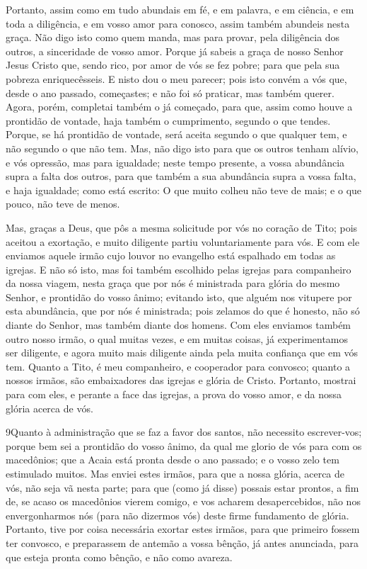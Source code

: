Portanto, assim como em tudo abundais em fé, e em palavra, e em
ciência, e em toda a diligência, e em vosso amor para conosco, assim
também abundeis nesta graça. Não digo isto como quem manda, mas
para provar, pela diligência dos outros, a sinceridade de vosso
amor. Porque já sabeis a graça de nosso Senhor Jesus Cristo que,
sendo rico, por amor de vós se fez pobre; para que pela sua pobreza
enriquecêsseis. E nisto dou o meu parecer; pois isto convém a
vós que, desde o ano passado, começastes; e não foi só praticar, mas
também querer. Agora, porém, completai também o já começado,
para que, assim como houve a prontidão de vontade, haja também o
cumprimento, segundo o que tendes. Porque, se há prontidão de
vontade, será aceita segundo o que qualquer tem, e não segundo o que
não tem. Mas, não digo isto para que os outros tenham alívio,
e vós opressão, mas para igualdade; neste tempo presente, a
vossa abundância supra a falta dos outros, para que também a sua
abundância supra a vossa falta, e haja igualdade; como está
escrito: O que muito colheu não teve de mais; e o que pouco, não
teve de menos.

Mas, graças a Deus, que pôs a mesma solicitude por vós no coração
de Tito; pois aceitou a exortação, e muito diligente partiu
voluntariamente para vós. E com ele enviamos aquele irmão
cujo louvor no evangelho está espalhado em todas as igrejas.
E não só isto, mas foi também escolhido pelas igrejas para
companheiro da nossa viagem, nesta graça que por nós é ministrada
para glória do mesmo Senhor, e prontidão do vosso ânimo;
evitando isto, que alguém nos vitupere por esta abundância,
que por nós é ministrada; pois zelamos do que é honesto, não
só diante do Senhor, mas também diante dos homens. Com eles
enviamos também outro nosso irmão, o qual muitas vezes, e em muitas
coisas, já experimentamos ser diligente, e agora muito mais
diligente ainda pela muita confiança que em vós tem. Quanto a
Tito, é meu companheiro, e cooperador para convosco; quanto a nossos
irmãos, são embaixadores das igrejas e glória de Cristo.
Portanto, mostrai para com eles, e perante a face das
igrejas, a prova do vosso amor, e da nossa glória acerca de vós.

\medskip

\lettrine{9} Quanto à administração que se faz a favor dos
santos, não necessito escrever-vos; porque bem sei a prontidão
do vosso ânimo, da qual me glorio de vós para com os macedônios; que
a Acaia está pronta desde o ano passado; e o vosso zelo tem
estimulado muitos. Mas enviei estes irmãos, para que a nossa
glória, acerca de vós, não seja vã nesta parte; para que (como já
disse) possais estar prontos, a fim de, se acaso os macedônios
vierem comigo, e vos acharem desapercebidos, não nos envergonharmos
nós (para não dizermos vós) deste firme fundamento de glória.
Portanto, tive por coisa necessária exortar estes irmãos, para
que primeiro fossem ter convosco, e preparassem de antemão a vossa
bênção, já antes anunciada, para que esteja pronta como bênção, e
não como avareza.

